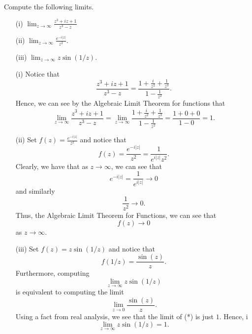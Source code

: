 \documentclass[a4paper]{article}
\begin{document}
\begin{problem}
    Compute the following limits.
    \begin{enumerate}
        \item[(i)] \( \displaystyle \lim_{ z \to \infty  }  \displaystyle \frac{ z^{3} + iz  + 1  }{ z^{3} - z  }  \)
        \item[(ii)] \( \displaystyle \lim_{ z \to \infty  }  \displaystyle \frac{ e^{-i | z | } }{ z^{2} }  \).
        \item[(iii)] \( \displaystyle \lim_{ z \to \infty  } z \sin (1 /z)  \).      
    \end{enumerate}
\end{problem}

\begin{solution}
\begin{enumerate}
    \item[(i)] Notice that 
        \[  \frac{ z^{3} + iz + 1  }{ z^{3} - z  }  = \frac{ 1 + \frac{ i }{ z^{2} }  + \frac{ 1 }{ z^{3} }  }{ 1 - \frac{ 1 }{ z^{2} }  }. \]
        Hence, we can see by the Algebraic Limit Theorem for functions that 
        \[  \lim_{ z \to \infty  } \frac{ z^{3} + iz + 1 }{ z^{3} - z  }  = \lim_{ z \to \infty  }   \frac{ 1 + \frac{ i }{ z^{2} }  + \frac{ 1 }{ z^{3} }  }{ 1 - \frac{ 1 }{ z^{2} }  } = \frac{ 1 + 0 + 0  }{ 1 - 0 } = 1. \]
    \item[(ii)] Set \( f(z) = \frac{ e^{-i | z | } }{ z^{2} }  \) and notice that 
        \[  f(z) = \frac{ e^{-i | z | } }{ z^{2} } = \frac{ 1 }{ e^{i | z | } z^{2} }.  \]
        Clearly, we have that as \( z \to \infty   \), we can see that
        \[  e^{-i | z | } = \frac{ 1  }{ e^{i | z | } }  \to 0 \]
        and similarly
        \[ \frac{ 1 }{ z^{2} }  \to 0.  \]
        Thus, the Algebraic Limit Theorem for Functions, we can see that
        \[  f(z)  \to 0  \]
        as \( z \to \infty  \).
        \[   \]
    \item[(iii)] Set \( f(z) = z \sin (1/z) \) and notice that 
        \[  f(1/z) = \frac{ \sin (z) }{ z }. \]
        Furthermore, computing
        \[  \lim_{ z \to \infty   } z \sin (1/z)  \]
        is equivalent to computing the limit
        \[  \lim_{ z \to 0 }  \frac{ \sin (z) }{ z }. \tag{*} \]
        Using a fact from real analysis, we see that the limit of (*) is just \( 1  \). Hence,  
        i\[  \lim_{ z \to \infty  }  z \sin (1/z) = 1. \]
\end{enumerate}
\end{solution}
\end{document}

